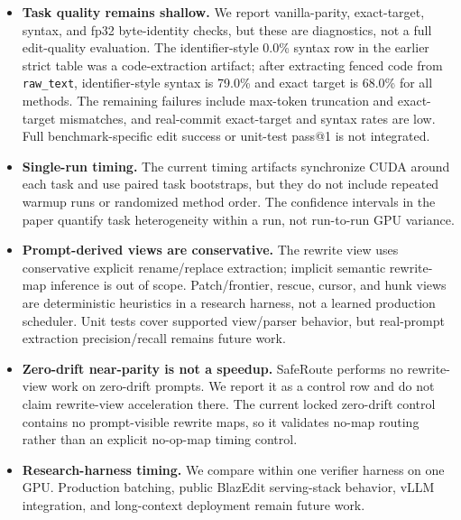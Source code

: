 \documentclass[11pt,a4paper]{article}
\begin{document}
\begin{itemize}
  bf16/eager drift while fp32/sdpa passes, so the evidence points to bf16
  numerical sensitivity rather than SDPA alone. This is not acceptable for
  deployment until the timing path is made byte-identical or the serving stack
  supplies an equivalent deterministic verifier.
\item \textbf{Task quality remains shallow.} We report vanilla-parity,
  exact-target, syntax, and fp32 byte-identity checks, but these are
  diagnostics, not a full edit-quality evaluation. The identifier-style 0.0\%
  syntax row in the earlier strict table was a code-extraction artifact; after
  extracting fenced code from \texttt{raw\_text}, identifier-style syntax is 79.0\% and
  exact target is 68.0\% for all methods. The remaining failures include
  max-token truncation and exact-target mismatches, and real-commit
  exact-target and syntax rates are low. Full benchmark-specific edit success
  or unit-test pass@1 is not integrated.
\item \textbf{Single-run timing.} The current timing artifacts synchronize
  CUDA around each task and use paired task bootstraps, but they do not
  include repeated warmup runs or randomized method order. The confidence
  intervals in the paper quantify task heterogeneity within a run, not
  run-to-run GPU variance.
\item \textbf{Prompt-derived views are conservative.} The rewrite view uses
  conservative explicit rename/replace extraction; implicit semantic
  rewrite-map inference is out of scope. Patch/frontier, rescue, cursor, and
  hunk views are deterministic heuristics in a research harness, not a learned
  production scheduler. Unit tests cover supported view/parser behavior, but
  real-prompt extraction precision/recall remains future work.
\item \textbf{Zero-drift near-parity is not a speedup.} SafeRoute
  performs no rewrite-view work on zero-drift prompts. We report it as
  a control row and do not claim rewrite-view acceleration there. The current
  locked zero-drift control contains no prompt-visible rewrite maps, so it
  validates no-map routing rather than an explicit no-op-map timing control.
\item \textbf{Research-harness timing.} We compare within one verifier
  harness on one GPU. Production batching, public BlazEdit serving-stack
  behavior, vLLM integration, and long-context deployment remain future
  work.
\end{itemize}

\end{document}
